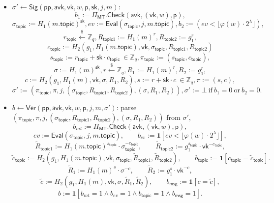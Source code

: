 \documentclass{article}
\newcommand{\pp}[0]{\mathsf{pp}}
\newcommand{\sk}[0]{\mathsf{sk}}
\newcommand{\vk}[0]{\mathsf{vk}}
\newcommand{\avk}[0]{\mathsf{avk}}
\newcommand{\mkpth}[0]{\mathsf{p}}
\newcommand{\topic}[0]{\mathsf{topic}}
\newcommand{\getsr}{\xleftarrow{\$}}
\begin{document}
\begin{itemize}
  \item $\sigma' \leftarrow \mathsf{Sig}(\pp,\avk,\vk,w,\mkpth,\sk,j,m)$:
        \[
          b_1:=\Pi_{\mathsf{MT}}.\mathsf{Check}(\avk,(\vk,w),\mkpth),
        \]
        \[
          \sigma_\topic := H_1(m.\topic)^{\sk},
          ev:=\mathsf{Eval}(\sigma_\topic,j,m.\topic),
          b_2:= (ev<\bigl\lfloor \varphi(w)\cdot 2^\lambda\bigr\rfloor),
        \]
        \[ 
          r_\topic\getsr \mathbb{Z}_q,
          R_{\topic1}:=H_1(m)^{r},
          R_{\topic2}:=g_1^{r},
        \]
        \[
          c_\topic := H_2(g_1,H_1(m.\topic),\vk,\sigma_\topic,R_{\topic1},R_{\topic2})
        \]
        \[
          s_\topic := r_\topic + \sk\cdot c_\topic\ \in\mathbb{Z}_q,
          \pi_\topic:=(s_\topic,c_\topic),
        \]
        \[
          \sigma := H_1(m)^{\sk},
          r\getsr \mathbb{Z}_q,
          R_{1}:=H_1(m)^{r},
          R_{2}:=g_1^{r},
        \]
        \[
          c := H_2(g_1,H_1(m),\vk,\sigma,R_{1},R_{2}),
          s := r + \sk\cdot c\ \in\mathbb{Z}_q,
          \pi:=(s,c),
        \]
        \[
          \sigma':=(\pi_\topic,\pi,j,(\sigma_\topic,R_{\topic1},R_{\topic2}),(\sigma,R_1,R_2)),
          \sigma':=\bot\ \text{if}\ b_1=0\ \text{or}\ b_2=0.
        \]

  \item $b\leftarrow \mathsf{Ver}(\pp,\avk,\vk,w,\mkpth,j,m,\sigma')$:
        parse $(\pi_\topic,\pi,j,(\sigma_\topic,R_{\topic1},R_{\topic2}),(\sigma,R_1,R_2))$ from $\sigma'$,
        \[b_{mt} := \Pi_{\mathsf{MT}}.\mathsf{Check}(\avk,(\vk,w),\mkpth),
        \]
        \[
          ev:=\mathsf{Eval}(\sigma_\topic,j,m.\topic),
        \qquad
          b_{ev} :=\mathbf{1}\!\left[ev<\bigl\lfloor \varphi(w)\cdot 2^\lambda\bigr\rfloor\right],
        \]
        \[
            \widetilde{R}_{\topic 1}:=H_1(m.\topic)^{s_\topic}\cdot \sigma_\topic^{-c_\topic},
            \qquad
            \widetilde{R}_{\topic 2}:=g_1^{s_\topic}\cdot \vk^{-c_\topic},
          \]
          \[
            \widetilde{c}_\topic:=H_2(g_1,H_1(m.\topic),\vk,\sigma_\topic,\widetilde{R}_{\topic1},\widetilde{R}_{\topic2}),
            \qquad
            b_\topic:=\mathbf{1}[c_\topic=\widetilde{c}_\topic].
          \]
        \[
          \widetilde{R}_{1}:=H_1(m)^{s}\cdot \sigma^{-c},
        \qquad
          \widetilde{R}_{2}:=g_1^{s}\cdot \vk^{-c},
        \]
        \[
          \widetilde{c}:=H_2(g_1,H_1(m),\vk,\sigma,\widetilde{R}_{1},\widetilde{R}_{2}),
        \qquad
          b_{\mathsf{msg}}:=\mathbf{1}[c=\widetilde{c}],
        \]
        \[
          b:=\mathbf{1}[b_{mt}=1\land b_{ev} =1\land b_{\topic}=1\land b_{\mathsf{msg}}=1].
        \]




\end{itemize}
\end{document}
